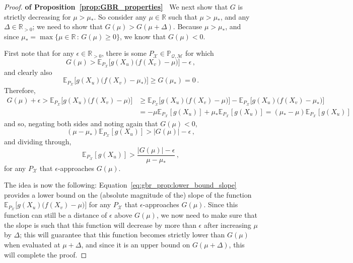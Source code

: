 \documentclass[twoside,11pt]{article}
\newcommand{\reals}{\mathbb{R}}
\newcommand{\realspos}{\reals_{>0}}
\newcommand{\states}{\mathcal{X}}
\newcommand{\rateset}{\mathcal{Q}}
\newcommand{\abs}[1]{\left\vert #1 \right\vert}
\begin{document}
\begin{proof}{\bf of Proposition~\ref{prop:GBR_properties}~}
We next show that $G$ is strictly decreasing for $\mu>\mu_*$. So consider any $\mu\in\reals$ such that $\mu>\mu_*$, and any $\Delta\in\realspos$; we need to show that $G(\mu)>G(\mu+\Delta)$. Because $\mu>\mu_*$, and since $\mu_*=\max\{\mu\in\reals\,:\,G(\mu)\geq 0\}$, we know that $G(\mu)<0$.

First note that for any $\epsilon\in\realspos$, there is some $P_{\states}\in\mathbb{P}_{\rateset,\mathcal{M}}$ for which
\begin{equation*}
G(\mu) > \mathbb{E}_{P_\states}\bigl[g(X_u)\bigl(f(X_v)-\mu\bigr)\bigr] - \epsilon\,,
\end{equation*}
and clearly also
\begin{equation*}
\mathbb{E}_{P_\states}\bigl[g(X_u)\bigl(f(X_v)-\mu_*\bigr)\bigr] \geq G(\mu_*) = 0\,.
\end{equation*}
Therefore,
\begin{align*}
G(\mu)+\epsilon > \mathbb{E}_{P_\states}\bigl[g(X_u)\bigl(f(X_v)-\mu\bigr)\bigr] 
 &\geq \mathbb{E}_{P_\states}\bigl[g(X_u)\bigl(f(X_v)-\mu\bigr)\bigr] - \mathbb{E}_{P_\states}\bigl[g(X_u)\bigl(f(X_v)-\mu_*\bigr)\bigr] \\
 &= -\mu\mathbb{E}_{P_\states}[g(X_u)] + \mu_*\mathbb{E}_{P_\states}[g(X_u)]
 = (\mu_*-\mu)\mathbb{E}_{P_\states}[g(X_u)]
\end{align*}
and so, negating both sides and noting again that $G(\mu)<0$,
\begin{equation*}
(\mu-\mu_*)\mathbb{E}_{P_\states}[g(X_u)] > \abs{G(\mu)}-\epsilon\,,
\end{equation*}
and dividing through,
\begin{equation}\label{eq:gbr_prop:lower_bound_slope}
\mathbb{E}_{P_\states}[g(X_u)] > \frac{\abs{G(\mu)}-\epsilon}{\mu-\mu_*}\,,
\end{equation}
for any $P_\states$ that $\epsilon$-approaches $G(\mu)$. 

The idea is now the following: Equation~\eqref{eq:gbr_prop:lower_bound_slope} provides a lower bound on the (absolute magnitude of the) slope of the function $\mathbb{E}_{P_\states}\bigl[g(X_u)\bigl(f(X_v)-\mu\bigr)\bigr]$ for any $P_\states$ that $\epsilon$-approaches $G(\mu)$. Since this function can still be a distance of $\epsilon$ above $G(\mu)$, we now need to make sure that the slope is such that this function will decrease by more than $\epsilon$ after increasing $\mu$ by $\Delta$; this will guarantee that this function becomes strictly lower than $G(\mu)$ when evaluated at $\mu+\Delta$, and since it is an upper bound on $G(\mu+\Delta)$, this will complete the proof.


\end{proof}
\end{document}
